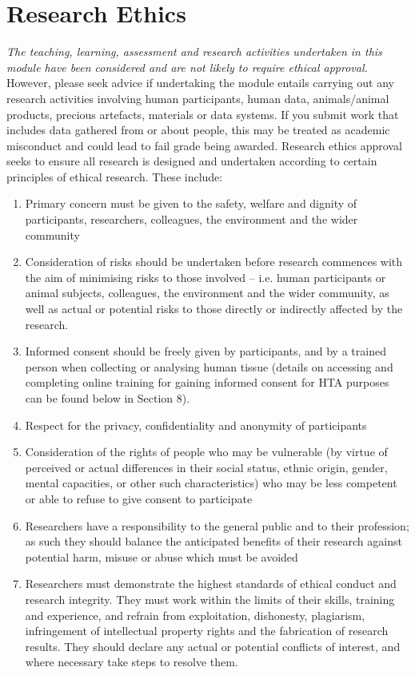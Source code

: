 \documentclass{MDXHandbook}
\begin{document}
{\chapter{Research Ethics}

    {\it The teaching, learning, assessment and research activities undertaken in this module have been considered and are not likely to require ethical approval. } However, please seek advice if undertaking the module entails carrying out any research activities involving human participants, human data, animals/animal products, precious artefacts, materials or data systems. If you submit work that includes data gathered from or about people, this may be treated as academic misconduct and could lead to fail grade being awarded. Research ethics approval seeks to ensure all research is designed and undertaken according to certain principles of ethical research. These include: 
\begin{enumerate}
	\item Primary concern must be given to the safety, welfare and dignity of participants, researchers, colleagues, the environment and the wider community 
	\item Consideration of risks should be undertaken before research commences with the aim of minimising risks to those involved – i.e. human participants or animal subjects, colleagues, the environment and the wider community, as well as actual or potential risks to those directly or indirectly affected by the research.
	\item Informed consent should be freely given by participants, and by a trained person when collecting or analysing human tissue (details on accessing and completing online training for gaining informed consent for HTA purposes can be found below in Section 8).
	\item Respect for the privacy, confidentiality and anonymity of participants 
	\item  Consideration of the rights of people who may be vulnerable (by virtue of perceived or actual differences in their social status, ethnic origin, gender, mental capacities, or other such characteristics) who may be less competent or able to refuse to give consent to participate
	\item Researchers have a responsibility to the general public and to their profession; as such they should balance the anticipated benefits of their research against potential harm, misuse or abuse which must be avoided 
	\item Researchers must demonstrate the highest standards of ethical conduct and research integrity. They must work within the limits of their skills, training and experience, and refrain from exploitation, dishonesty, plagiarism, infringement of intellectual property rights and the fabrication of research results. They should declare any actual or potential conflicts of interest, and where necessary take steps to resolve them. 

\end{enumerate}}
\end{document}
